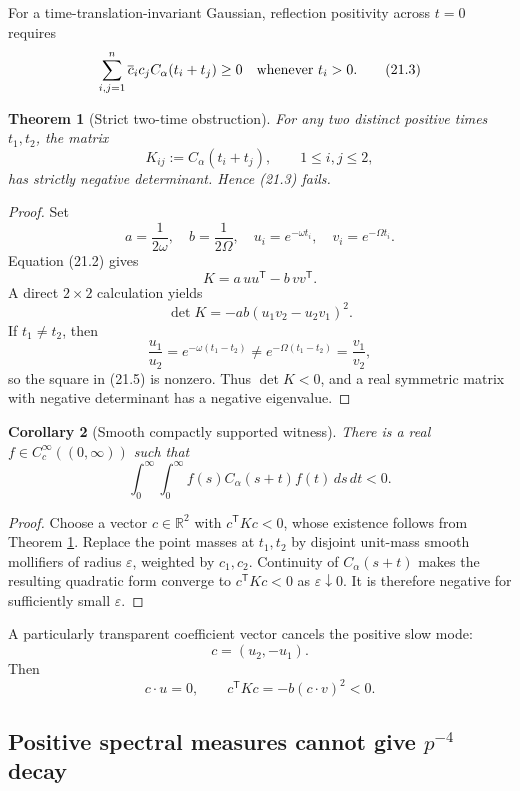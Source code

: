 \documentclass[11pt]{article}
\newtheorem{theorem}{Theorem}[section]
\newtheorem{corollary}[theorem]{Corollary}
\theoremstyle{remark}
\begin{document}
For a time-translation-invariant Gaussian, reflection positivity across
\(t=0\) requires
\[
 \sum_{i,j=1}^n\overline c_i c_j C_\alpha(t_i+t_j)\geq0
 \quad\hbox{whenever }t_i>0.                                  \tag{21.3}
\]

\begin{theorem}[Strict two-time obstruction]
\label{thm:v19v18-two-time}
For any two distinct positive times \(t_1,t_2\), the matrix
\[
 K_{ij}:=C_\alpha(t_i+t_j),\qquad 1\leq i,j\leq2,              \tag{21.4}
\]
has strictly negative determinant.  Hence (21.3) fails.
\end{theorem}

\begin{proof}
Set
\[
 a=\frac1{2\omega},\quad b=\frac1{2\Omega},\quad
 u_i=e^{-\omega t_i},\quad v_i=e^{-\Omega t_i}.
\]
Equation (21.2) gives
\[
 K=a\,uu^{\mathsf T}-b\,vv^{\mathsf T}.
\]
A direct \(2\times2\) calculation yields
\[
 \det K=-ab(u_1v_2-u_2v_1)^2.                                 \tag{21.5}
\]
If \(t_1\neq t_2\), then
\[
 \frac{u_1}{u_2}=e^{-\omega(t_1-t_2)}
 \neq e^{-\Omega(t_1-t_2)}=\frac{v_1}{v_2},
\]
so the square in (21.5) is nonzero.  Thus \(\det K<0\), and a real
symmetric matrix with negative determinant has a negative eigenvalue.
\end{proof}

\begin{corollary}[Smooth compactly supported witness]
\label{cor:v19v18-smooth}
There is a real \(f\in C_c^\infty((0,\infty))\) such that
\[
 \int_0^\infty\!\!\int_0^\infty
 f(s)C_\alpha(s+t)f(t)\,ds\,dt<0.                             \tag{21.6}
\]
\end{corollary}

\begin{proof}
Choose a vector \(c\in\mathbb R^2\) with \(c^{\mathsf T}Kc<0\), whose
existence follows from Theorem \ref{thm:v19v18-two-time}.  Replace the
point masses at \(t_1,t_2\) by disjoint unit-mass smooth mollifiers of
radius \(\varepsilon\), weighted by \(c_1,c_2\).  Continuity of
\(C_\alpha(s+t)\) makes the resulting quadratic form converge to
\(c^{\mathsf T}Kc<0\) as \(\varepsilon\downarrow0\).  It is therefore
negative for sufficiently small \(\varepsilon\).
\end{proof}

A particularly transparent coefficient vector cancels the positive slow
mode:
\[
 c=(u_2,-u_1).
\]
Then
\[
 c\cdot u=0,\qquad
 c^{\mathsf T}Kc=-b(c\cdot v)^2<0.                            \tag{21.7}
\]

\subsection{Positive spectral measures cannot give \(p^{-4}\) decay}
\end{document}
